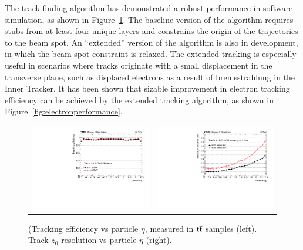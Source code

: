 The track finding algorithm has demonstrated a robust performance in software simulation, as shown in Figure~\ref{fig:trackingperformance}. The baseline version of the algorithm requires stubs from at least four unique layers and constrains the origin of the trajectories to the beam spot. An ``extended'' version of the algorithm is also in development, in which the beam spot constraint is relaxed. The extended tracking is especially useful in scenarios where tracks originate with a small displacement in the transverse plane, such as displaced electrons as a result of bremsstrahlung in the Inner Tracker. It has been shown that sizable improvement in electron tracking efficiency can be achieved by the extended tracking algorithm, as shown in Figure~\ref{fig:electronperformance}.

 \begin{figure}[tbh!]
 \begin{center}
  \begin{tabular}{cc}
   \includegraphics[width=.45\linewidth]{figures/Part2/Upgrade/L1TK_ttbar-pu200_eff_eta}&
   \includegraphics[width=.45\linewidth]{figures/Part2/Upgrade/L1TK_ttbar-pu200_resVsEta_z0}
  \end{tabular}
  \caption{(Tracking efficiency vs particle $\eta$, measured in $\textsf{t}\overline{\textsf{t}}$ samples (left). Track $z_0$ resolution vs particle $\eta$ (right).}
 \label{fig:trackingperformance}
 \end{center}
\end{figure} 

